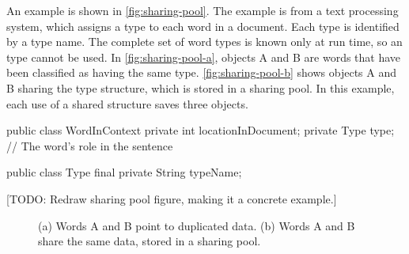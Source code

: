 An example is shown in \autoref{fig:sharing-pool}. The example is from a
text processing system, which assigns a type to each word in a document.
Each type is identified by a  type name.
The complete set of word types is known only at run time, so an 
type cannot be used.  In \autoref{fig:sharing-pool-a}, objects A and B
are words that have been classified as having the same type. 
\autoref{fig:sharing-pool-b} shows objects A and B sharing the type
structure, which is stored in a sharing pool. In this example, each use of a
shared structure saves three objects.

\begin{shortlisting}
public class WordInContext {
	private int  locationInDocument;
	private Type type;  // The word's role in the sentence
}

public class Type {
	final private String typeName;
}
\end{shortlisting}

[TODO: Redraw sharing pool figure, making it a concrete example.]

\begin{figure}
\centering
	\hspace{0.18\textwidth}
    \caption{(a) Words A and B point to duplicated data. (b) Words A and B
    share the same data, stored in a sharing pool.}
	\label{fig:sharing-pool}
\end{figure}


